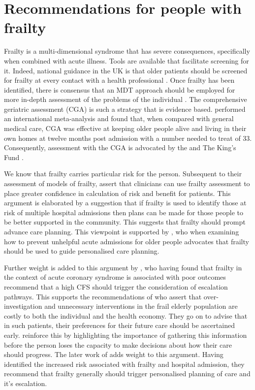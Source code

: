 \documentclass
[
	12pt,
	a4paper,
	oneside,
]{report}
\begin{document}
\section{Recommendations for people with frailty}

Frailty is a multi-dimensional syndrome that has severe consequences,
specifically when combined with acute illness. Tools are available that facilitate
screening for it. Indeed, national guidance in the UK is that older patients 
should be screened for frailty at every contact with a health professional 
\parencite{bgs:14}. Once frailty has been identified, there is consensus that
an MDT approach should be employed for more in-depth assessment of the 
problems of the individual \parencite{vellas:16}. The comprehensive geriatric
assessment (CGA) is such a strategy that is evidence based. \textcite{ellis:11}
performed an international 
meta-analysis and found that, when compared with general medical care,
CGA was effective at keeping older people alive and living in their own homes at
twelve months post admission with a number needed to treat of 33.
Consequently, assessment with the CGA is advocated by the \textcite{bgs:14}
and The King's Fund \parencite{oliver:14}.

We know that frailty carries particular risk for the person. Subsequent to their
assessment of models of frailty, 
\textcite{martin:08} assert that clinicians can use frailty assessment to place 
greater confidence
in calculation of risk and benefit for patients. This argument is elaborated by 
a suggestion that if frailty is used to identify those at risk of multiple 
hospital admissions then plans can be made for those people to be better
supported in the community. This suggests that frailty should prompt advance care
planning. This viewpoint is supported by 
\textcite{hunt:16}, who when examining how to prevent unhelpful acute admissions
for older people advocates that frailty should be used to guide personalised 
care planning.

Further weight is added to this argument by \textcite{kang:15}, who having 
found that frailty in the 
context of acute coronary syndrome is associated
with poor outcomes recommend that a high CFS should
trigger the consideration of escalation pathways. 
This supports the recommendations of \textcite{silver:12} who assert that over-investigation
and unnecessary interventions in the frail elderly population are costly to both the
individual and the health economy. They go on to advise that in such patients, 
their preferences for their future care should be ascertained early. \textcite{oliver:14} 
reinforce this by highlighting the importance of gathering this information
before the person loses the capacity to make decisions about how their care should
progress. The later work of \textcite{romero-ortuno:16} adds weight to this argument.
Having identified the increased risk associated with frailty and hospital admission, 
they recommend that frailty generally should trigger personalised planning of
care and it's escalation.
\end{document}
